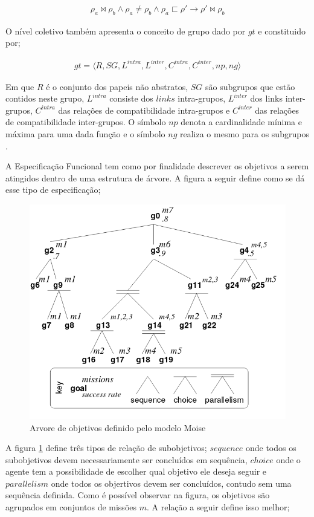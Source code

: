 \documentclass[12pt]{article}
\begin{document}
\begin{eqnarray}\nonumber
	\rho_a \bowtie \rho_b \wedge \rho_a \neq \rho_b \wedge \rho_a \sqsubset \rho' \to \rho' \bowtie \rho_b 
\end{eqnarray}

O nível coletivo também apresenta o conceito de grupo dado por $gt$ e constituido por;

\begin{eqnarray}\nonumber
	gt = \langle R,SG,L^{intra},L^{inter},C^{intra},C^{inter},np,ng\rangle 
\end{eqnarray}

Em que $R$ é o conjunto dos papeis não abstratos, $SG$ são subgrupos que estão contidos neste grupo, $L^{intra}$ consiste dos $links$ intra-grupos, $L^{inter}$ dos links inter-grupos, $C^{intra}$ das relações de compatibilidade intra-grupos e $C^{inter}$ das relações de compatibilidade inter-grupos. O símbolo $np$ denota a cardinalidade mínima e máxima para uma dada função e o símbolo $ng$ realiza o mesmo para os subgrupos \cite{mosieframework}. 

A Especificação Funcional tem como por finalidade descrever os objetivos a serem atingidos dentro de uma estrutura de árvore. A figura a seguir define como se dá esse tipo de especificação; 

\begin{figure}[H]
  \centering
  \includegraphics[width=0.8\linewidth]{figmoise} 
  \caption{Arvore de objetivos definido pelo modelo Moise \cite{mosieframework}}
  \label{arvoremoise}
\end{figure}

A figura \ref{arvoremoise} define três tipos de relação de subobjetivos; $sequence$ onde todos os subobjetivos devem necessariamente ser concluídos em sequência, $choice$ onde o agente tem a possibilidade de escolher qual objetivo ele deseja seguir e $parallelism$ onde todos os objertivos devem ser concluídos, contudo sem uma sequência definida. Como é possível observar na figura, os objetivos são agrupados em conjuntos de missões $m$. A relação a seguir define isso melhor;
\end{document}
